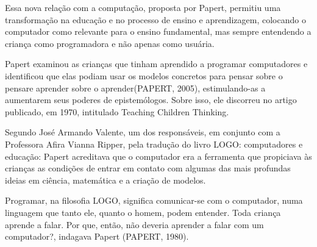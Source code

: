 \documentclass[
12pt,		%
openright,	%
twoside,  %
a4paper,			%
chapter=TITLE,		%
english,			%
french,				%
spanish,			%
brazil				%
]{USPSC-classe/USPSC}
\begin{document}
\noindent\begin{center}\mbox{\centering{}}\end{center}


Essa nova rela\c{c}\~ao com a computa\c{c}\~ao, proposta por Papert, permitiu uma transforma\c{c}\~ao na educa\c{c}\~ao e no processo de ensino e aprendizagem, colocando o computador como relevante para o ensino fundamental, mas sempre entendendo a crian\c{c}a como programadora e n\~ao apenas como usu\'aria.









Papert examinou as crian\c{c}as que tinham aprendido a programar computadores e identificou que elas podiam usar os modelos concretos para \textquotedbl pensar sobre o pensar\textquotedbl  e \textquotedbl aprender sobre o aprender\textquotedbl   (PAPERT, 2005), estimulando-as  a aumentarem seus poderes de epistem\'ologos. Sobre isso, ele discorreu no artigo publicado, em 1970, intitulado Teaching Children Thinking.









Segundo Jos\'e Armando Valente, um dos respons\'aveis, em conjunto com a Professora Afira Vianna Ripper, pela tradu\c{c}\~ao do livro LOGO: computadores e educa\c{c}\~ao: \textquotedbl Papert acreditava que o computador era a ferramenta que propiciava \`as crian\c{c}as as condi\c{c}\~oes de entrar em contato com algumas das mais profundas ideias em ci\^encia, matem\'atica e a cria\c{c}\~ao de modelos\textquotedbl .









Programar, na filosofia LOGO, significa \textquotedbl comunicar-se com o computador, numa linguagem que tanto ele, quanto o homem,  podem entender\textquotedbl . Toda crian\c{c}a aprende a falar. Por que, ent\~ao, n\~ao deveria aprender a \textquotedbl falar com um computador?\textquotedbl , indagava Papert  (PAPERT, 1980).
\end{document}
